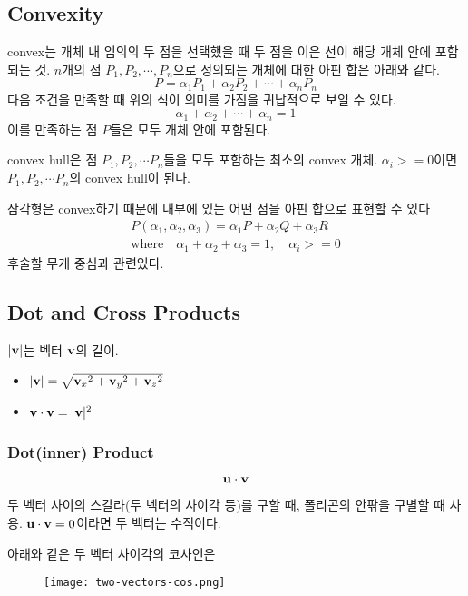 \subsection{Convexity}

convex는 개체 내 임의의 두 점을 선택했을 때 두 점을 이은 선이 해당 개체 안에 포함되는 것. $n$개의 점 $P_1, P_2, \cdots, P_n$으로 정의되는 개체에 대한 아핀 합은 아래와 같다.
$$P = \alpha_1 P_1 + \alpha_2 P_2 + \cdots + \alpha_n P_n$$
다음 조건을 만족할 때 위의 식이 의미를 가짐을 귀납적으로 보일 수 있다.
$${\alpha}_1 + {\alpha}_2 + \cdots + {\alpha}_n = 1$$
이를 만족하는 점 $P$들은 모두 개체 안에 포함된다.

convex hull은 점 $P_1, P_2, \cdots P_n$들을 모두 포함하는 최소의 convex 개체. $\alpha_i >= 0$이면 $P_1, P_2, \cdots P_n$의 convex hull이 된다.

삼각형은 convex하기 때문에 내부에 있는 어떤 점을 아핀 합으로 표현할 수 있다
$$
\begin{aligned}
  P(\alpha_1, \alpha_2, \alpha_3) = \alpha_1P + \alpha_2Q + \alpha_3R \\
  \text{where} \quad \alpha_1 + \alpha_2 + \alpha_3 = 1, \quad \alpha_i >= 0
\end{aligned}
$$
후술할 무게 중심과 관련있다.

\subsection{Dot and Cross Products}

$|\bold{v}|$는 벡터 $\bold{v}$의 길이.
\begin{itemize}
  \item $|\bold{v}| = \sqrt{{\bold{v}_x}^2 + {\bold{v}_y}^2 + {\bold{v}_z}^2}$
  \item $\bold{v} \cdot \bold{v} = |\bold{v}|^2$
\end{itemize}

\subsubsection{Dot(inner) Product}

$$\bold{u} \cdot \bold{v}$$

두 벡터 사이의 스칼라(두 벡터의 사이각 등)를 구할 때, 폴리곤의 안팎을 구별할 때 사용. $\bold{u} \cdot \bold{v} = 0$이라면 두 벡터는 수직이다.

아래와 같은 두 벡터 사이각의 코사인은

\begin{figure}[h]
  \centering
  \texttt{[image: two-vectors-cos.png]}
\end{figure}

